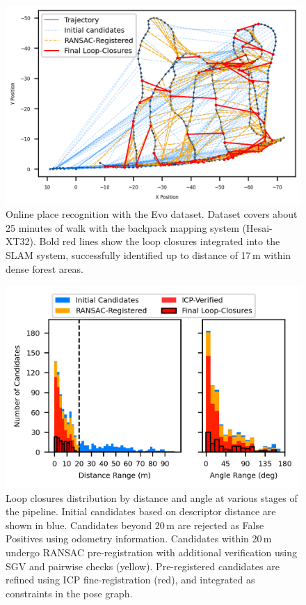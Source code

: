 \begin{figure}[t]
  \centering
  \includegraphics[width=0.99\columnwidth]{pics/exp_2_1_online_place_recognition}
  \caption{Online place recognition with the Evo dataset. Dataset covers about 25 minutes of walk with the backpack mapping system (Hesai-XT32). Bold red lines show the loop closures integrated into the SLAM system, successfully identified up to distance of 17\,m within dense forest areas.}
  \label{fig:exp_2_1_online_place_recognition}
\end{figure}

\begin{figure}[t]
  \centering
  \includegraphics[width=0.99\columnwidth]{pics/exp_2_2_loop_closure_histograms}
  \caption{Loop closures distribution by distance and angle at various stages of the pipeline.
   Initial candidates based on descriptor distance are shown in blue. Candidates beyond 20\,m are rejected as False Positives using odometry information. Candidates within 20\,m undergo RANSAC pre-registration with additional verification using SGV\cite{vidanapathirana2023ral} and pairwise checks (yellow). Pre-registered candidates are refined using ICP fine-registration (red), and integrated as constraints in the pose graph.
   }
  \label{fig:exp_2_2_loop_closure_histograms}
\end{figure}


